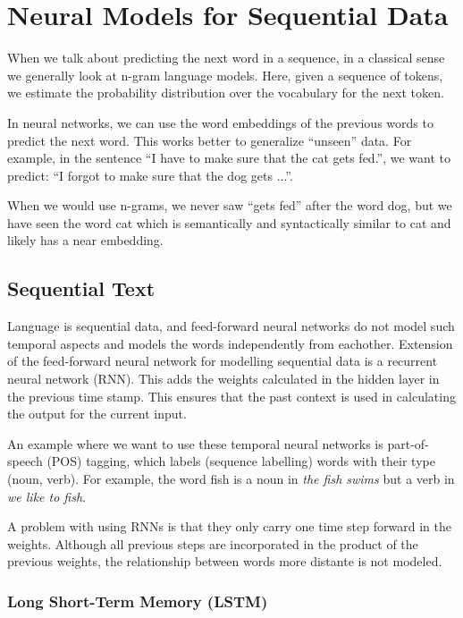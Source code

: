 \section{Neural Models for Sequential Data}

When we talk about predicting the next word in a sequence,
in a classical sense we generally look at n-gram language models.
Here, given a sequence of tokens, we estimate the probability
distribution over the vocabulary for the next token.

In neural networks, we can use the word embeddings of the previous
words to predict the next word. This works better to generalize ``unseen''
data. For example, in the sentence ``I have to make sure that the cat
gets fed.'',
we want to predict: ``I forgot to make sure that the dog gets ...''.

When we would use n-grams, we never saw ``gets fed'' after the word dog,
but we have seen the word cat which is semantically and syntactically similar
to cat and likely has a near embedding.

\subsection{Sequential Text}

Language is sequential data, and feed-forward neural networks do not
model such temporal aspects and models the words independently from eachother.
Extension of the feed-forward neural network for modelling sequential data is
a recurrent neural network (RNN). This adds the weights calculated in the hidden
layer in the previous time stamp. This ensures that the past context is used in
calculating the output for the current input.

An example where we want to use these temporal neural networks is
part-of-speech (POS)
tagging, which labels (sequence labelling) words with their type
(noun, verb). For example, the word fish
is a noun in \textit{the fish swims} but a verb in \textit{we like to fish}.

A problem with using RNNs is that they only carry one time step
forward in the weights.
Although all previous steps are incorporated in the product of the
previous weights, the relationship
between words more distante is not modeled.

\subsubsection{Long Short-Term Memory (LSTM)}

